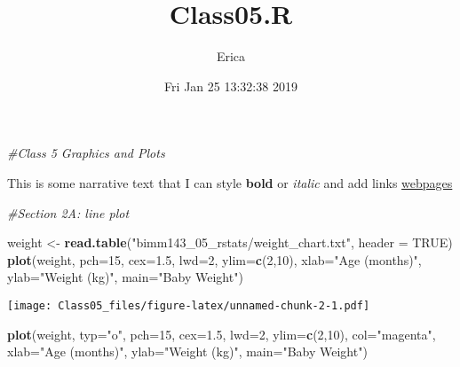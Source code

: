 \documentclass[]{article}
\title{Class05.R}
\author{Erica}
\date{Fri Jan 25 13:32:38 2019}
\newenvironment{Shaded}{\begin{snugshade}}{\end{snugshade}}
\newcommand{\KeywordTok}[1]{\textcolor[rgb]{0.13,0.29,0.53}{\textbf{#1}}}
\newcommand{\DataTypeTok}[1]{\textcolor[rgb]{0.13,0.29,0.53}{#1}}
\newcommand{\DecValTok}[1]{\textcolor[rgb]{0.00,0.00,0.81}{#1}}
\newcommand{\FloatTok}[1]{\textcolor[rgb]{0.00,0.00,0.81}{#1}}
\newcommand{\StringTok}[1]{\textcolor[rgb]{0.31,0.60,0.02}{#1}}
\newcommand{\CommentTok}[1]{\textcolor[rgb]{0.56,0.35,0.01}{\textit{#1}}}
\newcommand{\OtherTok}[1]{\textcolor[rgb]{0.56,0.35,0.01}{#1}}
\newcommand{\NormalTok}[1]{#1}
\begin{document}
\maketitle

\begin{Shaded}
\begin{Highlighting}[]
\CommentTok{#Class 5 Graphics and Plots}
\end{Highlighting}
\end{Shaded}

This is some narrative text that I can style \textbf{bold} or
\emph{italic} and add links
\href{https://rmarkdown.rstudio.com/articles_report_from_r_script.html}{webpages}

\begin{Shaded}
\begin{Highlighting}[]
\CommentTok{#Section 2A: line plot}

\NormalTok{weight <-}\StringTok{ }\KeywordTok{read.table}\NormalTok{(}\StringTok{"bimm143_05_rstats/weight_chart.txt"}\NormalTok{, }\DataTypeTok{header =} \OtherTok{TRUE}\NormalTok{)}
\KeywordTok{plot}\NormalTok{(weight, }\DataTypeTok{pch=}\DecValTok{15}\NormalTok{, }\DataTypeTok{cex=}\FloatTok{1.5}\NormalTok{, }\DataTypeTok{lwd=}\DecValTok{2}\NormalTok{, }\DataTypeTok{ylim=}\KeywordTok{c}\NormalTok{(}\DecValTok{2}\NormalTok{,}\DecValTok{10}\NormalTok{), }\DataTypeTok{xlab=}\StringTok{"Age (months)"}\NormalTok{, }\DataTypeTok{ylab=}\StringTok{"Weight (kg)"}\NormalTok{, }\DataTypeTok{main=}\StringTok{"Baby Weight"}\NormalTok{)}
\end{Highlighting}
\end{Shaded}

\texttt{[image: Class05\_files/figure-latex/unnamed-chunk-2-1.pdf]}

\begin{Shaded}
\begin{Highlighting}[]
\KeywordTok{plot}\NormalTok{(weight, }\DataTypeTok{typ=}\StringTok{"o"}\NormalTok{, }\DataTypeTok{pch=}\DecValTok{15}\NormalTok{, }\DataTypeTok{cex=}\FloatTok{1.5}\NormalTok{, }\DataTypeTok{lwd=}\DecValTok{2}\NormalTok{, }\DataTypeTok{ylim=}\KeywordTok{c}\NormalTok{(}\DecValTok{2}\NormalTok{,}\DecValTok{10}\NormalTok{), }\DataTypeTok{col=}\StringTok{"magenta"}\NormalTok{, }\DataTypeTok{xlab=}\StringTok{"Age (months)"}\NormalTok{, }\DataTypeTok{ylab=}\StringTok{"Weight (kg)"}\NormalTok{, }\DataTypeTok{main=}\StringTok{"Baby Weight"}\NormalTok{)}
\end{Highlighting}
\end{Shaded}
\end{document}
